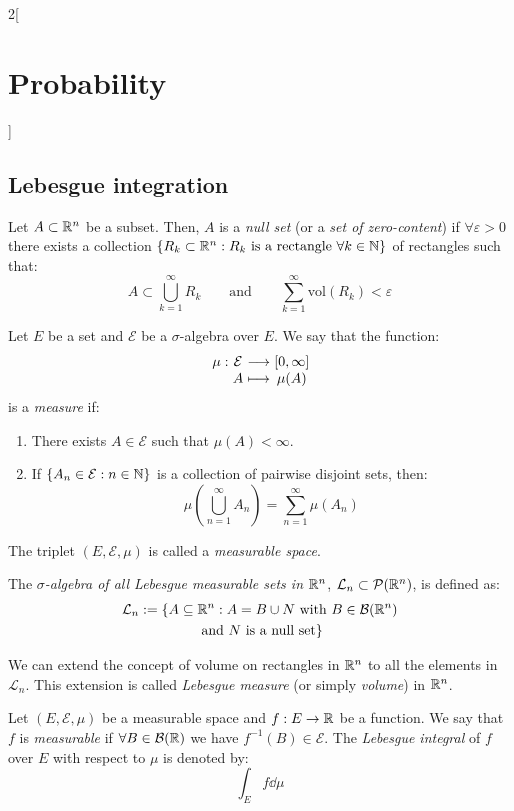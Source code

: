 \documentclass[../../../main.tex]{subfiles}
\begin{document}
\begin{multicols}{2}[\section{Probability}]
    \subsection{Lebesgue integration}
    \begin{definition}
        Let $A\subset\mathbb{R}^n$ be a subset. Then, $A$ is a \textit{null set} (or a \textit{set of zero-content}) if $\forall \varepsilon>0$ there exists a collection $\{R_k\subset\mathbb{R}^n:R_k\text{ is a rectangle }\forall k\in\mathbb{N}\}$ of rectangles such that:
        $$A\subset\bigcup_{k=1}^\infty R_k\qquad\text{and}\qquad\sum_{k=1}^\infty\text{vol}(R_k)<\varepsilon$$
    \end{definition}
    \begin{definition}
        Let $E$ be a set and $\mathcal{E}$ be a $\sigma$-algebra over $E$. We say that the function:
        $$
            \function{\mu}{\mathcal{E}}{[0,\infty]}{A}{\mu(A)}
        $$
        is a \textit{measure} if:
        \begin{enumerate}
            \item There exists $A\in\mathcal{E}$ such that $\mu(A)<\infty$.
            \item If $\{A_n\in\mathcal{E}:n\in\mathbb{N}\}$ is a collection of pairwise disjoint sets, then: $$\mu\left(\bigcup_{n=1}^\infty A_n\right)=\sum_{n=1}^\infty \mu(A_n)$$
        \end{enumerate}
        The triplet $(E,\mathcal{E},\mu)$ is called a \textit{measurable space}.
    \end{definition}
    \begin{definition}
        The \textit{$\sigma$-algebra of all Lebesgue measurable sets in $\mathbb{R}^n$}, $\mathcal{L}_n\subset\mathcal{P}(\mathbb{R}^n)$, is defined as:
        \begin{multline*}
            \mathcal{L}_n:=\{A\subseteq\mathbb{R}^n:A=B\cup N\text{ with }B\in\mathcal{B}(\mathbb{R}^n)\\\text{ and $N$ is a null set}\}
        \end{multline*}
    \end{definition}
    \begin{theorem}
        We can extend the concept of volume on rectangles in $\mathbb{R}^n$ to all the elements in $\mathcal{L}_n$. This extension is called \textit{Lebesgue measure} (or simply \textit{volume}) in $\mathbb{R}^n$.
    \end{theorem}
    \begin{definition}
        Let $(E,\mathcal{E},\mu)$ be a measurable space and $f:E\rightarrow\mathbb{R}$ be a function. We say that $f$ is \textit{measurable} if $\forall B\in\mathcal{B}(\mathbb{R})$ we have $f^{-1}(B)\in\mathcal{E}$. The \textit{Lebesgue integral} of $f$ over $E$ with respect to $\mu$ is denoted by: $$\int_Ef\dd\mu$$

\end{definition}
\end{multicols}
\end{document}
